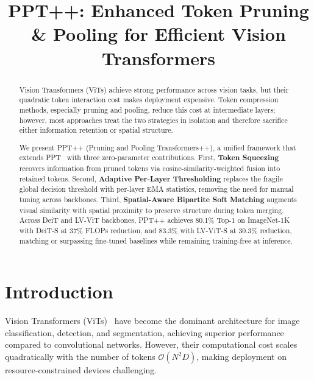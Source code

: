 \documentclass[10pt,twocolumn,letterpaper]{article}
\title{PPT++: Enhanced Token Pruning \& Pooling for Efficient Vision Transformers}
\begin{document}
\maketitle


\begin{abstract}
Vision Transformers (ViTs) achieve strong performance across vision tasks, but
their quadratic token interaction cost makes deployment expensive. Token
compression methods, especially pruning and pooling, reduce this cost at
intermediate layers; however, most approaches treat the two strategies in
isolation and therefore sacrifice either information retention or spatial
structure.

We present PPT++ (Pruning and Pooling Transformers++), a unified framework that
extends PPT~\cite{wu2023ppt} with three zero-parameter contributions. First,
\textbf{Token Squeezing} recovers information from pruned tokens via
cosine-similarity-weighted fusion into retained tokens. Second,
\textbf{Adaptive Per-Layer Thresholding} replaces the fragile global decision
threshold with per-layer EMA statistics, removing the need for manual tuning
across backbones. Third, \textbf{Spatial-Aware Bipartite Soft Matching}
augments visual similarity with spatial proximity to preserve structure during
token merging. Across DeiT and LV-ViT backbones, PPT++ achieves 80.1\% Top-1 on
ImageNet-1K with DeiT-S at 37\% FLOPs reduction, and 83.3\% with LV-ViT-S at
30.3\% reduction, matching or surpassing fine-tuned baselines while remaining
training-free at inference.
\end{abstract}



\section{Introduction}

Vision Transformers (ViTs)~\cite{dosovitskiy2020vit} have become the dominant
architecture for image classification, detection, and segmentation, achieving
superior performance compared to convolutional networks. However, their
computational cost scales quadratically with the number of tokens $\mathcal{O}(N^2 D)$,
making deployment on resource-constrained devices challenging.
\end{document}
